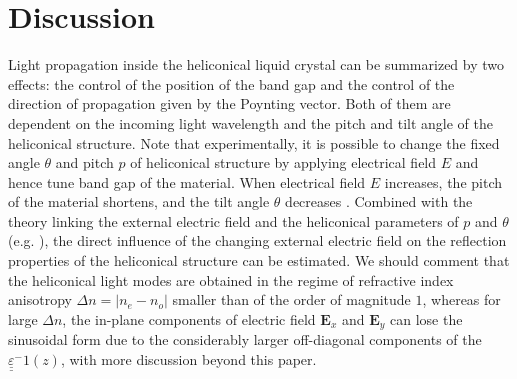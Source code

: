 \documentclass{osa-article}
\renewcommand{\vec}[1]{\mathbf{#1}}
\begin{document}
\section{Discussion}


Light propagation inside the heliconical liquid crystal can be summarized by two effects: 
the control of the position of the band gap and the control of the direction of propagation given by the Poynting vector. 
Both of them are dependent on the incoming light wavelength and the pitch and tilt angle of the heliconical structure. 
Note that experimentally, it is possible to change the fixed angle $\theta$ and pitch $p$ of heliconical structure by applying electrical field $E$ and hence tune band gap of the material. 
When electrical field $E$ increases, the pitch of the material shortens, and the tilt angle $\theta$ decreases \cite{XiangJ_PhysRevLett112_2014}. 
Combined with the theory linking the external electric field and the heliconical parameters of $p$ and $\theta$ (e.g. \cite{XiangJ_PhysRevLett112_2014}), 
the direct influence of the changing external electric field on the reflection properties of the heliconical structure can be estimated. 
We should comment that the heliconical light modes are obtained in the regime of refractive index anisotropy $\Delta n = | n_e - n_o |$ smaller than of the order of magnitude $1$,
whereas for large $\Delta n$, the in-plane components of electric field $\vec{E}_x$ and $\vec{E}_y$ can lose the sinusoidal form 
due to the considerably larger off-diagonal components of the $\underline{\underline{\varepsilon}}^-1(z)$, with more discussion beyond this paper. 
\end{document}
